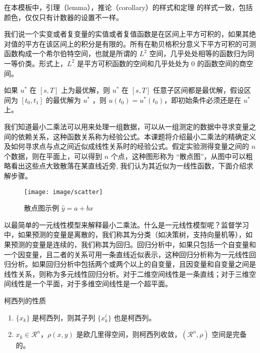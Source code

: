\documentclass[cn,11pt,fancy,hide]{elegantbook}
\providecommand{\tightlist}{%
  \setlength{\itemsep}{0pt}\setlength{\parskip}{0pt}}
\begin{document}
\begin{note}

在本模板中，引理（lemma），推论（corollary）的样式和定理 的样式一致，包括颜色，仅仅只有计数器的设置不一样。

\end{note}

我们说一个实变或者复变量的实值或者复值函数是在区间上平方可积的，如果其绝对值的平方在该区间上的积分是有限的。所有在勒贝格积分意义下平方可积的可测函数构成一个希尔伯特空间，也就是所谓的 \(L^2\) 空间，几乎处处相等的函数归为同一等价类。形式上，\(L^2\) 是平方可积函数的空间和几乎处处为 0 的函数空间的商空间。

\begin{description}
\tightlist
\item[最优性原理]
如果 \(u^*\) 在 \([s,T]\) 上为最优解，则 \(u^*\) 在 \([s, T]\) 任意子区间都是最优解，假设区间为 \([t_0, t_1]\) 的最优解为 \(u^*\) ，则 \(u(t_0)=u^{*}(t_0)\)，即初始条件必须还是在 \(u^*\) 上。
\end{description}

我们知道最小二乘法可以用来处理一组数据，可以从一组测定的数据中寻求变量之间的依赖关系，这种函数关系称为经验公式。本课题将介绍最小二乘法的精确定义及如何寻求点与点之间近似成线性关系时的经验公式。假定实验测得变量之间的 \(n\) 个数据，则在平面上，可以得到 \(n\) 个点，这种图形称为 ``散点图''，从图中可以粗略看出这些点大致散落在某直线近旁, 我们认为其近似为一线性函数，下面介绍求解步骤。

\begin{figure}

{\centering \texttt{[image: image/scatter]} 

}

\caption{散点图示例 $\hat{y}=a+bx$}\label{fig:scatter}
\end{figure}

以最简单的一元线性模型来解释最小二乘法。什么是一元线性模型呢？监督学习中，如果预测的变量是离散的，我们称其为分类（如决策树，支持向量机等），如果预测的变量是连续的，我们称其为回归。回归分析中，如果只包括一个自变量和一个因变量，且二者的关系可用一条直线近似表示，这种回归分析称为一元线性回归分析。如果回归分析中包括两个或两个以上的自变量，且因变量和自变量之间是线性关系，则称为多元线性回归分析。对于二维空间线性是一条直线；对于三维空间线性是一个平面，对于多维空间线性是一个超平面。

\begin{shaded}

柯西列的性质

\begin{enumerate}
\def\labelenumi{\arabic{enumi}.}
\tightlist
\item
  \(\{x_k\}\) 是柯西列，则其子列 \(\{x_k^i\}\) 也是柯西列。
\item
  \(x_k\in \mathcal{R}^n\)，\(\rho(x,y)\) 是欧几里得空间，则柯西列收敛，\((\mathcal{R}^n,\rho)\) 空间是完备的。
\end{enumerate}

\end{shaded}
\end{document}

